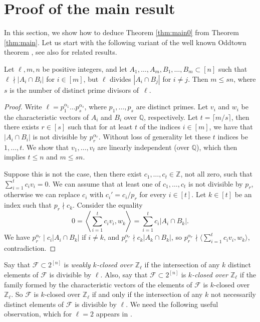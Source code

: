 	\section{Proof of the main result}
	
	In this section, we show how to deduce Theorem \ref{thm:main0} from Theorem \ref{thm:main}. Let us start with the following variant of the well known Oddtown theorem \cite{B69}, see also \cite{BF92} for related results.
	
	\begin{lemma}\label{lemma:oddtown}
		Let $\ell,m,n$ be positive integers, and let $A_1,\dots,A_m,B_1,\dots,B_m\subset [n]$ such that $\ell\nmid|A_{i}\cap B_{i}|$ for $i\in [m]$, but $\ell$ divides $|A_{i}\cap B_{j}|$ for $i\neq j$. Then $m\leq sn$, where $s$ is the number of distinct prime divisors of~$\ell$.
	\end{lemma}
	
	\begin{proof}
		Write $\ell=p_1^{\alpha_1}\dots p_{s}^{\alpha_s}$, where $p_1,\dots,p_s$ are distinct primes. Let $v_{i}$ and $w_{i}$ be the characteristic vectors of $A_{i}$ and $B_{i}$ over $\mathbb{Q}$, respectively. Let $t=\lceil m/s\rceil$, then there exists $r\in [s]$ such that for at least $t$ of the indices $i\in [m]$, we have that $|A_{i}\cap B_{i}|$ is not divisible by $p_{r}^{\alpha_r}$. Without loss of generality let these $t$ indices be $1,\dots,t$. We show that $v_1,\dots,v_t$ are linearly independent (over $\mathbb{Q}$), which then implies $t\leq n$ and $m\leq sn$.
		
		Suppose this is not the case, then there exist $c_1,\dots,c_t\in\mathbb{Z}$, not all zero, such that $\sum_{i=1}^{t}c_{i}v_{i}=0$. We can assume that at least one of $c_1,\dots,c_t$ is not divisible by $p_r$, otherwise we can replace $c_i$ with $c_i'=c_i/p_r$ for every $i\in [t]$. Let $k\in [t]$ be an index such that $p_r\nmid c_{k}$. Consider the equality 
		$$0=\left\langle\sum_{i=1}^{t}c_{i} v_{i},w_{k}\right\rangle=\sum_{i=1}^{t}c_{i} |A_i\cap B_k|.$$
		We have $p_r^{\alpha_{r}}\mid c_i|A_{i}\cap B_{k}|$ if $i\neq k$, and $p_r^{\alpha_r}\nmid c_k|A_{k}\cap B_{k}|$, so $p_r^{\alpha_{r}}\nmid \langle\sum_{i=1}^{t}c_{i} v_{i},w_{k}\rangle$, contradiction.
	\end{proof}
	
	Say that $\mathcal{F}\subset 2^{[n]}$ is \emph{weakly $k$-closed over $\mathbb{Z}_{\ell}$} if the intersection of any $k$ distinct elements of $\mathcal{F}$ is divisible by $\ell$. Also, say that $\mathcal{F}\subset 2^{[n]}$ is \emph{$k$-closed over $\mathbb{Z}_{\ell}$} if the family formed by the characteristic vectors of the elements of $\mathcal{F}$ is $k$-closed over $\mathbb{Z}_{\ell}$. So $\mathcal{F}$ is $k$-closed over $\mathbb{Z}_{\ell}$ if and only if the intersection of any $k$ not necessarily distinct elements of $\mathcal{F}$ is divisible by $\ell$. We need the following useful observation, which for $\ell=2$ appears in \cite{SV18}. 
	
